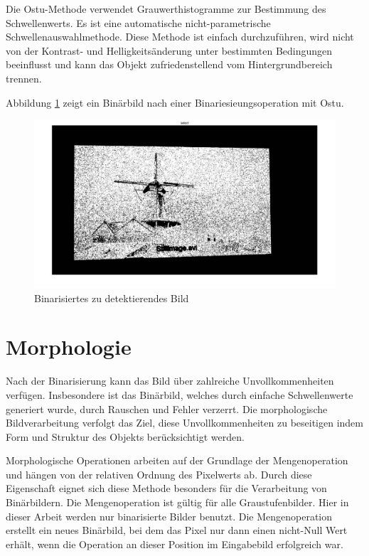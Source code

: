 Die Ostu-Methode verwendet Grauwerthistogramme zur Bestimmung des Schwellenwerts. Es ist eine automatische nicht-parametrische Schwellenauswahlmethode. Diese Methode ist einfach durchzuführen, wird nicht von der Kontrast- und Helligkeitsänderung unter bestimmten Bedingungen beeinflusst und kann das Objekt zufriedenstellend vom Hintergrundbereich trennen.

Abbildung \ref{fig:binarisierungbild} zeigt ein Binärbild nach einer Binariesieungsoperation mit Ostu.

\begin{figure}[H]
 \centering 
  \includegraphics[keepaspectratio,width=1.0\textwidth]{images/4_ZweiteErfahrung/binar/binarisierung.pdf}
 \caption{Binarisiertes zu detektierendes Bild}
 \label{fig:binarisierungbild}
\end{figure} 



\section{Morphologie}

Nach der Binarisierung kann das Bild über zahlreiche Unvollkommenheiten verfügen. Insbesondere ist das Binärbild, welches durch einfache Schwellenwerte generiert wurde, durch Rauschen und Fehler verzerrt. Die morphologische Bildverarbeitung verfolgt das Ziel, diese Unvollkommenheiten zu beseitigen indem Form und Struktur des Objekts berücksichtigt werden.

Morphologische Operationen arbeiten auf der Grundlage der Mengenoperation und hängen von der relativen Ordnung des Pixelwerts ab. Durch diese Eigenschaft eignet sich diese Methode besonders für die Verarbeitung von Binärbildern. Die Mengenoperation ist gültig für alle Graustufenbilder. Hier in dieser Arbeit werden nur binarisierte Bilder benutzt. Die Mengenoperation erstellt ein neues Binärbild, bei dem das Pixel nur dann einen nicht-Null Wert erhält, wenn die Operation an dieser Position im Eingabebild erfolgreich war.

